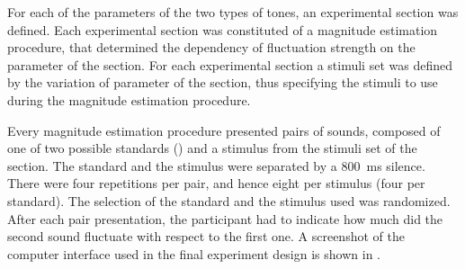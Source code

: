 \documentclass[../main.tex]{subfiles}
\begin{document}
For each of the parameters of the two types of tones, an experimental section
was defined. Each experimental section was constituted of a magnitude estimation
procedure, that determined the dependency of fluctuation strength on the
parameter of the section. For each experimental section a stimuli set was
defined by the variation of parameter of the section, thus specifying the
stimuli to use during the magnitude estimation procedure.

Every magnitude estimation procedure presented pairs of sounds, composed of one
of two possible standards () and a stimulus from the
stimuli set of the section. The standard and the stimulus were separated by a
800~ms silence. There were four repetitions per pair, and hence eight per
stimulus (four per standard). The selection of the standard and the stimulus
used was randomized. After each pair presentation, the participant had to
indicate how much did the second sound fluctuate with respect to the first one.
A screenshot of the computer interface used in the final experiment design is
shown in .
\end{document}
